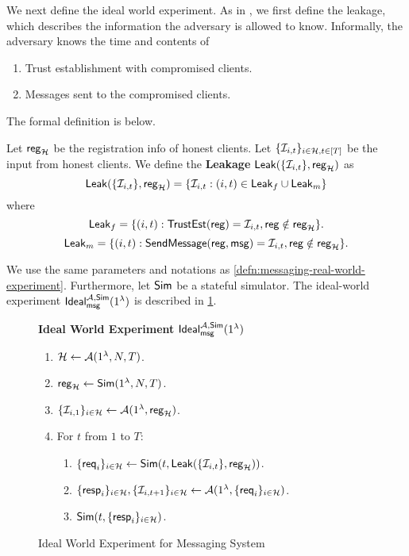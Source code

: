We next define the ideal world experiment. As in \cite{shi2021non}, we first define the leakage, which describes the information the adversary is allowed to know. Informally, the adversary knows the time and contents of
\begin{enumerate}
    \item Trust establishment with compromised clients.
    \item Messages sent to the compromised clients.
\end{enumerate}
The formal definition is below.

\begin{definition}
\label{defn:messaging-leakage}
Let $\mathsf{reg}_{\mathcal{H}}$ be the registration info of honest clients. Let $\{\mathcal{I}_{i, t}\}_{i \in \mathcal{H}, t \in [T]}$ be the input from honest clients. We define the \textbf{Leakage} $\mathsf{Leak}(\{\mathcal{I}_{i, t}\}, \mathsf{reg}_{\mathcal{H}})$ as
$$\mathsf{Leak}(\{\mathcal{I}_{i, t}\}, \mathsf{reg}_{\mathcal{H}}) = \{\mathcal{I}_{i, t}: (i, t) \in \mathsf{Leak}_f \cup \mathsf{Leak}_m\}$$
where
$$\mathsf{Leak}_f = \{(i, t): \mathsf{TrustEst}(\mathsf{reg}) = \mathcal{I}_{i, t}, \mathsf{reg} \notin \mathsf{reg}_{\mathcal{H}}\}.$$
$$\mathsf{Leak}_m = \{(i, t): \mathsf{SendMessage}(\mathsf{reg}, \mathsf{msg}) = \mathcal{I}_{i, t}, \mathsf{reg} \notin \mathsf{reg}_{\mathcal{H}}\}.$$
\end{definition}
\begin{definition}
\label{defn:messaging-ideal-world-experiment}
We use the same parameters and notations as \cref{defn:messaging-real-world-experiment}. Furthermore, let $\mathsf{Sim}$ be a stateful simulator. The ideal-world experiment $\mathsf{Ideal}_{\mathsf{msg}}^{\mathcal{A}, \mathsf{Sim}}(1^{\lambda})$ is described in \cref{expr:messaging-ideal-world}.
\begin{figure}[h]
\begin{framed}
\textbf{Ideal World Experiment }$\mathsf{Ideal}_{\mathsf{msg}}^{\mathcal{A}, \mathsf{Sim}}(1^{\lambda})$
\begin{enumerate}
\item $\mathcal{H} \leftarrow \mathcal{A}(1^{\lambda}, N, T)$.
\item $\mathsf{reg}_{\mathcal{H}} \leftarrow \mathsf{Sim}(1^{\lambda}, N, T)$. 
\item $\{\mathcal{I}_{i, 1}\}_{i \in \mathcal{H}} \leftarrow \mathcal{A}(1^{\lambda}, \mathsf{reg}_{\mathcal{H}})$.
\item For $t$ from $1$ to $T$:
    \begin{enumerate}
    \item  $\{\mathsf{req}_i\}_{i \in \mathcal{H}} \leftarrow \mathsf{Sim}(t, \mathsf{Leak}(\{\mathcal{I}_{i, t}\}, \mathsf{reg}_{\mathcal{H}}))$.
    
    \item $\{\mathsf{resp}_i\}_{i \in \mathcal{H}}, \{\mathcal{I}_{i, t + 1}\}_{i \in \mathcal{H}} \leftarrow \mathcal{A}(1^{\lambda}, \{\mathsf{req}_i\}_{i \in \mathcal{H}})$.
    
    \item $\mathsf{Sim}(t, \{\mathsf{resp}_i\}_{i \in \mathcal{H}})$.
    \end{enumerate}
\end{enumerate}
\end{framed}
\caption{Ideal World Experiment for Messaging System}
\label{expr:messaging-ideal-world}
\end{figure}

\end{definition}

